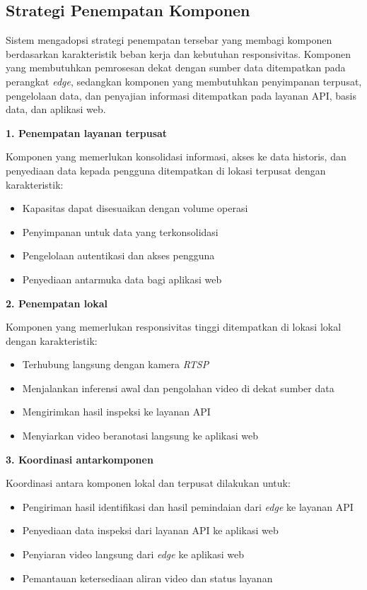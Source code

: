 \subsection{Strategi Penempatan Komponen}

Sistem mengadopsi strategi penempatan tersebar yang membagi komponen berdasarkan karakteristik beban kerja dan kebutuhan responsivitas. Komponen yang membutuhkan pemrosesan dekat dengan sumber data ditempatkan pada perangkat \textit{edge}, sedangkan komponen yang membutuhkan penyimpanan terpusat, pengelolaan data, dan penyajian informasi ditempatkan pada layanan API, basis data, dan aplikasi web.

\textbf{1. Penempatan layanan terpusat}

Komponen yang memerlukan konsolidasi informasi, akses ke data historis, dan penyediaan data kepada pengguna ditempatkan di lokasi terpusat dengan karakteristik:

\begin{itemize}
  \item Kapasitas dapat disesuaikan dengan volume operasi
  \item Penyimpanan untuk data yang terkonsolidasi
  \item Pengelolaan autentikasi dan akses pengguna
  \item Penyediaan antarmuka data bagi aplikasi web
\end{itemize}

\textbf{2. Penempatan lokal}

Komponen yang memerlukan responsivitas tinggi ditempatkan di lokasi lokal dengan karakteristik:

\begin{itemize}
  \item Terhubung langsung dengan kamera \textit{RTSP}
  \item Menjalankan inferensi awal dan pengolahan video di dekat sumber data
  \item Mengirimkan hasil inspeksi ke layanan API
  \item Menyiarkan video beranotasi langsung ke aplikasi web
\end{itemize}

\textbf{3. Koordinasi antarkomponen}

Koordinasi antara komponen lokal dan terpusat dilakukan untuk:

\begin{itemize}
  \item Pengiriman hasil identifikasi dan hasil pemindaian dari \textit{edge} ke layanan API
  \item Penyediaan data inspeksi dari layanan API ke aplikasi web
  \item Penyiaran video langsung dari \textit{edge} ke aplikasi web
  \item Pemantauan ketersediaan aliran video dan status layanan
\end{itemize}

